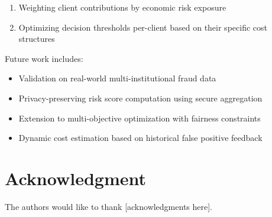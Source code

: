 \documentclass[conference]{IEEEtran}
\begin{document}
\begin{enumerate}
    \item Weighting client contributions by economic risk exposure
    \item Optimizing decision thresholds per-client based on their specific cost structures
\end{enumerate}

Future work includes:
\begin{itemize}
    \item Validation on real-world multi-institutional fraud data
    \item Privacy-preserving risk score computation using secure aggregation
    \item Extension to multi-objective optimization with fairness constraints
    \item Dynamic cost estimation based on historical false positive feedback
\end{itemize}

\section*{Acknowledgment}

The authors would like to thank [acknowledgments here].
\end{document}
